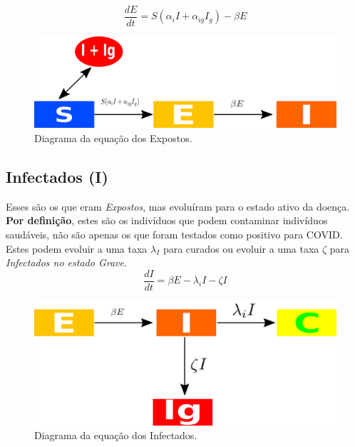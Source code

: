 \documentclass{article}
\begin{document}
\begin{equation}
    \frac{dE}{dt}= S(\alpha_i I +\alpha_{ig}I_g) - \beta E
\end{equation}
\begin{figure}[!h]
\centering
\includegraphics[scale=0.4]{covidE}
\caption{Diagrama da equação dos Expostos.}
\label{fig:universe}
\end{figure}

\subsection{Infectados (I)}
Esses são os que eram \textit{Expostos}, mas evoluíram para o estado ativo da doença. \textbf{Por definição}, estes são os indivíduos que podem contaminar indivíduos saudáveis, não são apenas os que foram testados como positivo para COVID. Estes podem evoluir a uma taxa $\lambda_I$ para curados ou evoluir a uma taxa $\zeta$ para \textit{Infectados no estado Grave}.
\begin{equation}
    \frac{dI}{dt}= \beta E -\lambda_i I - \zeta I
\end{equation}
\begin{figure}[!h]
\centering
\includegraphics[scale=0.4]{covidI}
\caption{Diagrama da equação dos Infectados.}
\label{fig:universe}
\end{figure}
\end{document}
